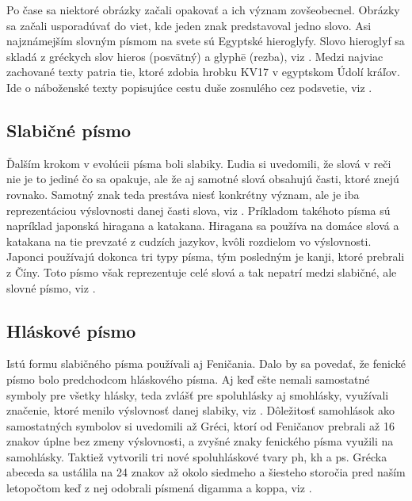 \documentclass[11pt, a4paper]{article}
\begin{document}
Po čase sa niektoré obrázky začali opakovať a ich význam zovšeobecnel. Obrázky sa začali usporadúvať do viet, kde jeden znak predstavoval jedno slovo. Asi najznámejším slovným písmom na svete sú Egyptské hieroglyfy. Slovo hieroglyf sa skladá z gréckych slov hieros (posvätný) a glyphē (rezba), viz \cite{Online_Etymology_Dictionary}. Medzi najviac zachované texty patria tie, ktoré zdobia hrobku KV17 v egyptskom Údolí kráľov. Ide o náboženské texty popisujúce cestu duše zosnulého cez podsvetie, viz \cite{Lull_Painted_Tomb}.

\subsection{Slabičné písmo}

Ďalším krokom v evolúcii písma boli slabiky. Ľudia si uvedomili, že slová v reči nie je to jediné čo sa opakuje, ale že aj samotné slová obsahujú časti, ktoré znejú rovnako. Samotný znak teda prestáva niesť konkrétny význam, ale je iba reprezentáciou výslovnosti danej časti slova, viz \cite{Marek2013thesis}. Príkladom takéhoto písma sú napríklad japonská hiragana a katakana. Hiragana sa používa na domáce slová a katakana na tie prevzaté z cudzích jazykov, kvôli rozdielom vo výslovnosti. Japonci používajú dokonca tri typy písma, tým posledným je kanji, ktoré prebrali z Číny. Toto písmo však reprezentuje celé slová a tak nepatrí medzi slabičné, ale slovné písmo, viz \cite{Harun_Biduri_2024}.

\subsection{Hláskové písmo}

Istú formu slabičného písma používali aj Feničania. Dalo by sa povedať, že fenické písmo bolo predchodcom hláskového písma. Aj keď ešte nemali samostatné symboly pre všetky hlásky, teda zvlášť pre spoluhlásky aj smohlásky, využívali značenie, ktoré menilo výslovnosť danej slabiky, viz \cite{gelb1963study}. Dôležitosť samohlások ako samostatných symbolov si uvedomili až Gréci, ktorí od Feničanov prebrali až 16 znakov úplne bez zmeny výslovnosti, a zvyšné znaky fenického písma využili na samohlásky. Taktiež vytvorili tri nové spoluhláskové tvary ph, kh a ps. Grécka abeceda sa ustálila na 24 znakov až okolo siedmeho a šiesteho storočia pred naším letopočtom keď z nej odobrali písmená digamma a koppa, viz \cite{SEMERADOVA2014thesis}.
\end{document}
